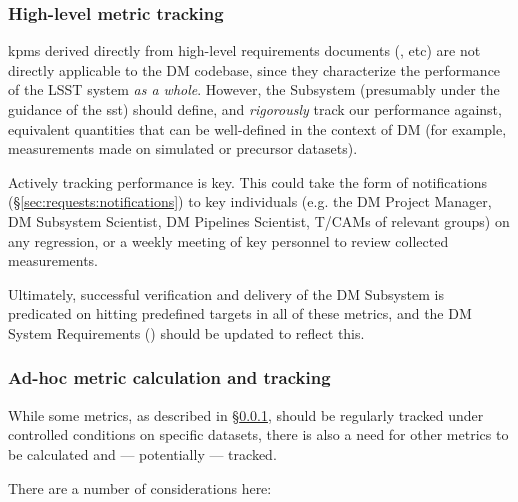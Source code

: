 \documentclass[DM,authoryear,toc,lsstdraft]{lsstdoc}
\begin{document}
\subsubsection{High-level metric tracking}
\label{sec:requests:kpmtrack}

\Glspl{kpm} derived directly from high-level requirements documents
(, etc) are not directly applicable to the DM
codebase, since they characterize the performance of the LSST system
\textit{as a whole}. However, the Subsystem (presumably under the guidance of
the \gls{sst}) should define, and \textit{rigorously} track our performance
against, equivalent quantities that can be well-defined in the context of DM
(for example, measurements made on simulated or precursor datasets).

Actively tracking performance is key. This could take the form of
notifications (\S\ref{sec:requests:notifications}) to key individuals (e.g.
the DM Project Manager, DM Subsystem Scientist, DM Pipelines Scientist, T/CAMs
of relevant groups) on any regression, or a weekly meeting of key personnel to
review collected measurements.

Ultimately, successful verification and delivery of the DM Subsystem is
predicated on hitting predefined targets in all of these \glspl{metric}, and
the DM System Requirements () should be updated to reflect
this.

\subsubsection{Ad-hoc metric calculation and tracking}
\label{sec:requests:adhoctrack}

While some \glspl{metric}, as described in \S\ref{sec:requests:kpmtrack},
should be regularly tracked under controlled conditions on specific datasets,
there is also a need for other metrics to be calculated and --- potentially
--- tracked.

There are a number of considerations here:
\end{document}
